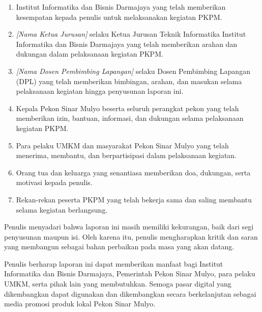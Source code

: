 \documentclass[12pt,a4paper]{article}
\newcommand{\placeholder}[1]{\textit{[#1]}}
\begin{document}
\begin{enumerate}[
    leftmargin=1.25cm,
    label=\arabic*.,
    itemsep=0pt,
    topsep=0.2cm
]

    \item Institut Informatika dan Bisnis Darmajaya yang telah
    memberikan kesempatan kepada penulis untuk melaksanakan
    kegiatan PKPM.

    \item \placeholder{Nama Ketua Jurusan} selaku Ketua Jurusan
    Teknik Informatika Institut Informatika dan Bisnis Darmajaya
    yang telah memberikan arahan dan dukungan dalam pelaksanaan
    kegiatan PKPM.

    \item \placeholder{Nama Dosen Pembimbing Lapangan} selaku Dosen
    Pembimbing Lapangan (DPL) yang telah memberikan bimbingan,
    arahan, dan masukan selama pelaksanaan kegiatan hingga
    penyusunan laporan ini.

    \item Kepala Pekon Sinar Mulyo beserta seluruh perangkat pekon
    yang telah memberikan izin, bantuan, informasi, dan dukungan
    selama pelaksanaan kegiatan PKPM.

    \item Para pelaku UMKM dan masyarakat Pekon Sinar Mulyo yang
    telah menerima, membantu, dan berpartisipasi dalam pelaksanaan
    kegiatan.

    \item Orang tua dan keluarga yang senantiasa memberikan doa,
    dukungan, serta motivasi kepada penulis.

    \item Rekan-rekan peserta PKPM yang telah bekerja sama dan
    saling membantu selama kegiatan berlangsung.

\end{enumerate}

Penulis menyadari bahwa laporan ini masih memiliki kekurangan,
baik dari segi penyusunan maupun isi. Oleh karena itu, penulis
mengharapkan kritik dan saran yang membangun sebagai bahan
perbaikan pada masa yang akan datang.

Penulis berharap laporan ini dapat memberikan manfaat bagi
Institut Informatika dan Bisnis Darmajaya, Pemerintah Pekon
Sinar Mulyo, para pelaku UMKM, serta pihak lain yang membutuhkan.
Semoga pasar digital yang dikembangkan dapat digunakan dan
dikembangkan secara berkelanjutan sebagai media promosi produk
lokal Pekon Sinar Mulyo.

\vspace{1.5cm}
\end{document}
